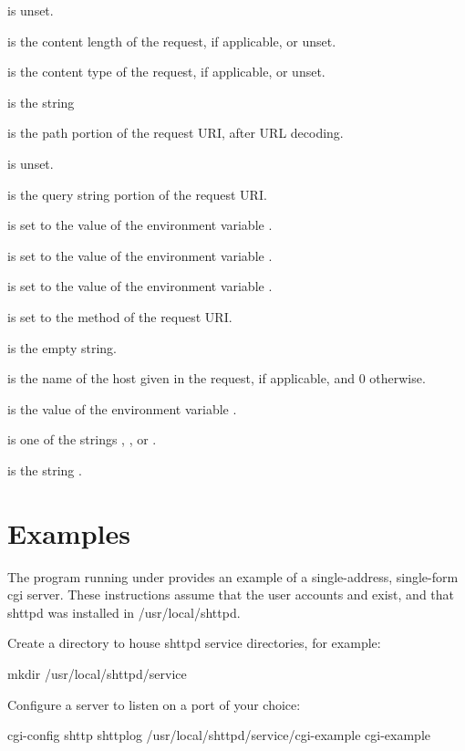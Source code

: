  is unset.

 is the content length of the request, if
applicable, or unset.

 is the content type of the request, if
applicable, or unset.

 is the string 

 is the path portion of the request URI, after URL
decoding.

 is unset.

 is the query string portion of the request URI.

 is set to the value of the environment variable .

 is set to the value of the environment variable .

 is set to the value of the environment variable .

 is set to the method of the request URI.

 is the empty string.

 is the name of the host given in the request, if
applicable, and 0 otherwise.

 is the value of the environment variable .

 is one of the strings ,
, or .

 is the string .


\section{Examples}
The  program running under  provides
an example of a single-address, single-form cgi server.  These
instructions assume that the user accounts  and
 exist, and that shttpd was installed in
/usr/local/shttpd.

Create a directory to house shttpd service directories, for example:
\begin{code}
  mkdir /usr/local/shttpd/service
\end{code}

Configure a  server to listen on a port of your choice:
\begin{code}
  cgi-config shttp shttplog /usr/local/shttpd/service/cgi-example  cgi-example
\end{code}

